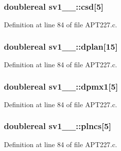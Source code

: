 \subsubsection[{\texorpdfstring{csd}{csd}}]{\setlength{\rightskip}{0pt plus 5cm}doublereal sv1\+\_\+\_\+\+::csd\mbox{[}5\mbox{]}}\hypertarget{structsv1__1___a19786e803648b8b095ffdb4f402ab471}{}\label{structsv1__1___a19786e803648b8b095ffdb4f402ab471}


Definition at line 84 of file A\+P\+T227.\+c.

\subsubsection[{\texorpdfstring{dplan}{dplan}}]{\setlength{\rightskip}{0pt plus 5cm}doublereal sv1\+\_\+\_\+\+::dplan\mbox{[}15\mbox{]}}\hypertarget{structsv1__1___a272b00b37c68e67ac5b6aadff856b3d8}{}\label{structsv1__1___a272b00b37c68e67ac5b6aadff856b3d8}


Definition at line 84 of file A\+P\+T227.\+c.

\subsubsection[{\texorpdfstring{dpmx1}{dpmx1}}]{\setlength{\rightskip}{0pt plus 5cm}doublereal sv1\+\_\+\_\+\+::dpmx1\mbox{[}5\mbox{]}}\hypertarget{structsv1__1___ae07d5c5e8ceb1db83d0ac71deeaa16c8}{}\label{structsv1__1___ae07d5c5e8ceb1db83d0ac71deeaa16c8}


Definition at line 84 of file A\+P\+T227.\+c.

\subsubsection[{\texorpdfstring{plncs}{plncs}}]{\setlength{\rightskip}{0pt plus 5cm}doublereal sv1\+\_\+\_\+\+::plncs\mbox{[}5\mbox{]}}\hypertarget{structsv1__1___a7c117b224eaaa69300447d45743d15b9}{}\label{structsv1__1___a7c117b224eaaa69300447d45743d15b9}


Definition at line 84 of file A\+P\+T227.\+c.

